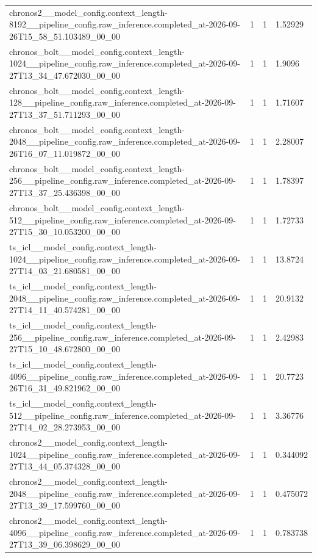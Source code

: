 \begin{tabular}{llll}
chronos2\_\_model\_config.context\_length-8192\_\_pipeline\_config.raw\_inference.completed\_at-2026-09-26T15\_58\_51.103489\_00\_00 & 1 & 1 & 1.52929 \\
chronos\_bolt\_\_model\_config.context\_length-1024\_\_pipeline\_config.raw\_inference.completed\_at-2026-09-27T13\_34\_47.672030\_00\_00 & 1 & 1 & 1.9096 \\
chronos\_bolt\_\_model\_config.context\_length-128\_\_pipeline\_config.raw\_inference.completed\_at-2026-09-27T13\_37\_51.711293\_00\_00 & 1 & 1 & 1.71607 \\
chronos\_bolt\_\_model\_config.context\_length-2048\_\_pipeline\_config.raw\_inference.completed\_at-2026-09-26T16\_07\_11.019872\_00\_00 & 1 & 1 & 2.28007 \\
chronos\_bolt\_\_model\_config.context\_length-256\_\_pipeline\_config.raw\_inference.completed\_at-2026-09-27T13\_37\_25.436398\_00\_00 & 1 & 1 & 1.78397 \\
chronos\_bolt\_\_model\_config.context\_length-512\_\_pipeline\_config.raw\_inference.completed\_at-2026-09-27T15\_30\_10.053200\_00\_00 & 1 & 1 & 1.72733 \\
ts\_icl\_\_model\_config.context\_length-1024\_\_pipeline\_config.raw\_inference.completed\_at-2026-09-27T14\_03\_21.680581\_00\_00 & 1 & 1 & 13.8724 \\
ts\_icl\_\_model\_config.context\_length-2048\_\_pipeline\_config.raw\_inference.completed\_at-2026-09-27T14\_11\_40.574281\_00\_00 & 1 & 1 & 20.9132 \\
ts\_icl\_\_model\_config.context\_length-256\_\_pipeline\_config.raw\_inference.completed\_at-2026-09-27T15\_10\_48.672800\_00\_00 & 1 & 1 & 2.42983 \\
ts\_icl\_\_model\_config.context\_length-4096\_\_pipeline\_config.raw\_inference.completed\_at-2026-09-26T16\_31\_49.821962\_00\_00 & 1 & 1 & 20.7723 \\
ts\_icl\_\_model\_config.context\_length-512\_\_pipeline\_config.raw\_inference.completed\_at-2026-09-27T14\_02\_28.273953\_00\_00 & 1 & 1 & 3.36776 \\
chronos2\_\_model\_config.context\_length-1024\_\_pipeline\_config.raw\_inference.completed\_at-2026-09-27T13\_44\_05.374328\_00\_00 & 1 & 1 & 0.344092 \\
chronos2\_\_model\_config.context\_length-2048\_\_pipeline\_config.raw\_inference.completed\_at-2026-09-27T13\_39\_17.599760\_00\_00 & 1 & 1 & 0.475072 \\
chronos2\_\_model\_config.context\_length-4096\_\_pipeline\_config.raw\_inference.completed\_at-2026-09-27T13\_39\_06.398629\_00\_00 & 1 & 1 & 0.783738 \\

\end{tabular}
